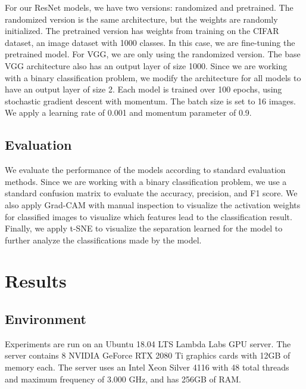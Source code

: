 \documentclass{aci}
\numberwithin{equation}{section}
\begin{document}
For our ResNet models, we have two versions: randomized and pretrained. The
randomized version is the same architecture, but the weights are randomly
initialized. The pretrained version has weights from training on the CIFAR
dataset, an image dataset with 1000 classes. In this case, we are fine-tuning
the pretrained model. For VGG, we are only using the randomized version. The
base VGG architecture also has an output layer of size 1000. Since we are
working with a binary classification problem, we modify the architecture for all
models to have an output layer of size 2. Each model is trained over 100 epochs,
using stochastic gradient descent with momentum. The batch size is set to 16
images. We apply a learning rate of 0.001 and momentum parameter of 0.9.


\subsection{Evaluation}

We evaluate the performance of the models according to standard evaluation
methods. Since we are working with a binary classification problem, we use a
standard confusion matrix to evaluate the accuracy, precision, and F1 score. We
also apply Grad-CAM with manual inspection to visualize the activation weights
for classified images to visualize which features lead to the classification
result. Finally, we apply t-SNE to visualize the separation learned for the
model to further analyze the classifications made by the model.

\section{Results}
\subsection{Environment}

Experiments are run on an Ubuntu 18.04 LTS Lambda Labs GPU server. The server
contains 8 NVIDIA GeForce RTX 2080 Ti graphics cards with 12GB of memory each.
The server uses an Intel Xeon Silver 4116 with 48 total threads and maximum
frequency of 3.000 GHz, and has 256GB of RAM.
\end{document}
